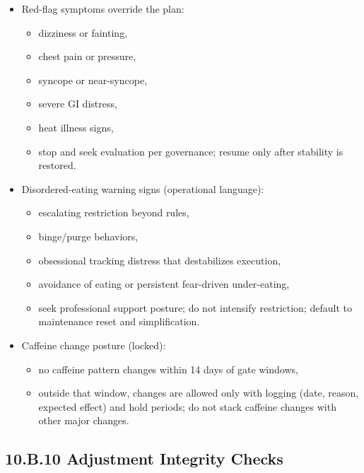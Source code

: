 \documentclass[10pt]{article}
\begin{document}
\begin{itemize}
\item Red-flag symptoms override the plan:
\begin{itemize}
\item dizziness or fainting,
\item chest pain or pressure,
\item syncope or near-syncope,
\item severe GI distress,
\item heat illness signs,
\item \textrightarrow{} stop and seek evaluation per governance; resume only after stability is restored.
\end{itemize}
\item Disordered-eating warning signs (operational language):
\begin{itemize}
\item escalating restriction beyond rules,
\item binge/purge behaviors,
\item obsessional tracking distress that destabilizes execution,
\item avoidance of eating or persistent fear-driven under-eating,
\item \textrightarrow{} seek professional support posture; do not intensify restriction; default to maintenance reset and simplification.
\end{itemize}
\item Caffeine change posture (locked):
\begin{itemize}
\item no caffeine pattern changes within 14 days of gate windows,
\item outside that window, changes are allowed only with logging (date, reason, expected effect) and hold periods; do not stack caffeine changes with other major changes.
\end{itemize}
\end{itemize}

\newpage
\subsection*{10.B.10 Adjustment Integrity Checks}
{}
\end{document}
